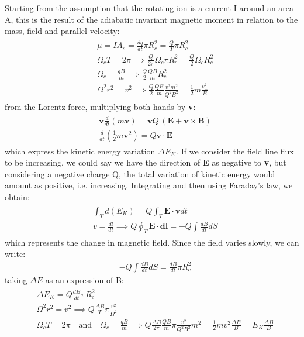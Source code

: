 \documentclass[12pt,a4paper]{article}
\begin{document}
Starting from the assumption that the rotating ion is a current I around an area A, this is the result of the adiabatic invariant magnetic moment in relation to the mass, field and parallel velocity:
\begin{align}
\begin{split}
\label{22}
    &\mu=IA_s=\frac{dq}{dt}\pi R_c^2=\frac{Q}{T}\pi R_c^2 \\
    &\Omega_c T=2\pi \implies \frac{Q}{2\pi}\Omega_c\pi R_c^2=\frac{Q}{2}\Omega_c R_c^2 \\
    &\Omega_c=\frac{qB}{m}\implies\frac{Q}{2}\frac{QB}{m}R_c^2 \\
    &\Omega^2r^2=v^2\implies\frac{Q}{2}\frac{QB}{m}\frac{v^2m^2}{Q^2B^2}= \frac{1}{2}m\frac{v_\bot^2}{B}
\end{split}
\end{align}
from the Lorentz force, multiplying both hands by \textbf{v}:
\begin{align}
\begin{split}
    &\textbf{v}\frac{d}{dt}(m\textbf{v})=\textbf{v}Q\,(\textbf{E}+\textbf{v}\times\textbf{B}) \\
    &\frac{d}{dt}(\frac{1}{2}m\textbf{v}^2)=Q\textbf{v}\cdot\textbf{E}
\end{split}
\end{align}
which express the kinetic energy variation $\Delta E_K$. If we consider the field line flux to be increasing, we could say we have the direction of \textbf{E} as negative to \textbf{v}, but considering a negative charge Q, the total variation of kinetic energy would amount as positive, i.e. increasing. Integrating and then using Faraday's law, we obtain:
\begin{align}
    \begin{split}
        &\int_T d(E_K)=Q\int_T \textbf{E}\cdot\textbf{v}dt \\
        &v=\frac{dl}{dt}\implies Q\oint_T \textbf{E}\cdot\textbf{dl}=-Q\int\frac{dB}{dt}dS
    \end{split}
\end{align}
which represents the change in magnetic field. Since the field varies slowly, we can write:
\begin{align}
    &-Q\int\frac{dB}{dt}dS=\frac{dB}{dt}\pi R^2_c
\end{align}
taking $\Delta E$ as an expression of B:
\begin{align}
    \begin{split}
        &\Delta E_K=Q\frac{dB}{dt}\pi R^2_c \\
        &\Omega^2r^2=v^2\implies Q\frac{\Delta B}{T}\pi\frac{v^2}{\Omega^2} \\
        &\Omega_c T=2\pi\quad\textrm{and}\quad\Omega_c=\frac{qB}{m}\implies Q\frac{\Delta B}{2\pi}\frac{QB}{m}\pi\frac{v^2}{Q^2B^2}m^2=\frac{1}{2}mv^2\frac{\Delta B}{B}=E_K\frac{\Delta B}{B}
    \end{split}
\end{align}
\end{document}
